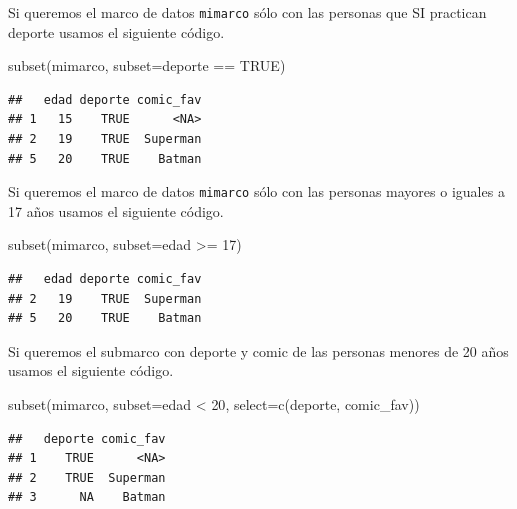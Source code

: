 \documentclass[
]{book}
\makeatletter
\newenvironment{Shaded}{\begin{snugshade}}{\end{snugshade}}
\newcommand{\AttributeTok}[1]{\textcolor[rgb]{0.77,0.63,0.00}{#1}}
\newcommand{\ConstantTok}[1]{\textcolor[rgb]{0.00,0.00,0.00}{#1}}
\newcommand{\DecValTok}[1]{\textcolor[rgb]{0.00,0.00,0.81}{#1}}
\newcommand{\FunctionTok}[1]{\textcolor[rgb]{0.00,0.00,0.00}{#1}}
\newcommand{\NormalTok}[1]{#1}
\newcommand{\SpecialCharTok}[1]{\textcolor[rgb]{0.00,0.00,0.00}{#1}}
\newcommand{\StringTok}[1]{\textcolor[rgb]{0.31,0.60,0.02}{#1}}
\newenvironment{kframe}{%
\medskip{}
\setlength{\fboxsep}{.8em}
 \def\at@end@of@kframe{}%
 \ifinner\ifhmode%
  \def\at@end@of@kframe{\end{minipage}}%
  \begin{minipage}{\columnwidth}%
 \fi\fi%
 \def\FrameCommand##1{\hskip\@totalleftmargin \hskip-\fboxsep
 \colorbox{shadecolor}{##1}\hskip-\fboxsep
     \hskip-\linewidth \hskip-\@totalleftmargin \hskip\columnwidth}%
 \MakeFramed {\advance\hsize-\width
   \@totalleftmargin\z@ \linewidth\hsize
   \@setminipage}}%
 {\par\unskip\endMakeFramed%
 \at@end@of@kframe}
\renewenvironment{Shaded}{\begin{kframe}}{\end{kframe}}
\makeatother
\begin{document}
Si queremos el marco de datos \texttt{mimarco} sólo con las personas que SI practican deporte usamos el siguiente código.

\begin{Shaded}
\begin{Highlighting}[]
\FunctionTok{subset}\NormalTok{(mimarco, }\AttributeTok{subset=}\NormalTok{deporte }\SpecialCharTok{==} \ConstantTok{TRUE}\NormalTok{)}
\end{Highlighting}
\end{Shaded}

\begin{verbatim}
##   edad deporte comic_fav
## 1   15    TRUE      <NA>
## 2   19    TRUE  Superman
## 5   20    TRUE    Batman
\end{verbatim}

Si queremos el marco de datos \texttt{mimarco} sólo con las personas mayores o iguales a 17 años usamos el siguiente código.

\begin{Shaded}
\begin{Highlighting}[]
\FunctionTok{subset}\NormalTok{(mimarco, }\AttributeTok{subset=}\NormalTok{edad }\SpecialCharTok{\textgreater{}=} \DecValTok{17}\NormalTok{)}
\end{Highlighting}
\end{Shaded}

\begin{verbatim}
##   edad deporte comic_fav
## 2   19    TRUE  Superman
## 5   20    TRUE    Batman
\end{verbatim}

Si queremos el submarco con deporte y comic de las personas menores de 20 años usamos el siguiente código.

\begin{Shaded}
\begin{Highlighting}[]
\FunctionTok{subset}\NormalTok{(mimarco, }\AttributeTok{subset=}\NormalTok{edad }\SpecialCharTok{\textless{}} \DecValTok{20}\NormalTok{, }\AttributeTok{select=}\FunctionTok{c}\NormalTok{(}\StringTok{\textquotesingle{}deporte\textquotesingle{}}\NormalTok{, }\StringTok{\textquotesingle{}comic\_fav\textquotesingle{}}\NormalTok{))}
\end{Highlighting}
\end{Shaded}

\begin{verbatim}
##   deporte comic_fav
## 1    TRUE      <NA>
## 2    TRUE  Superman
## 3      NA    Batman
\end{verbatim}
\end{document}
